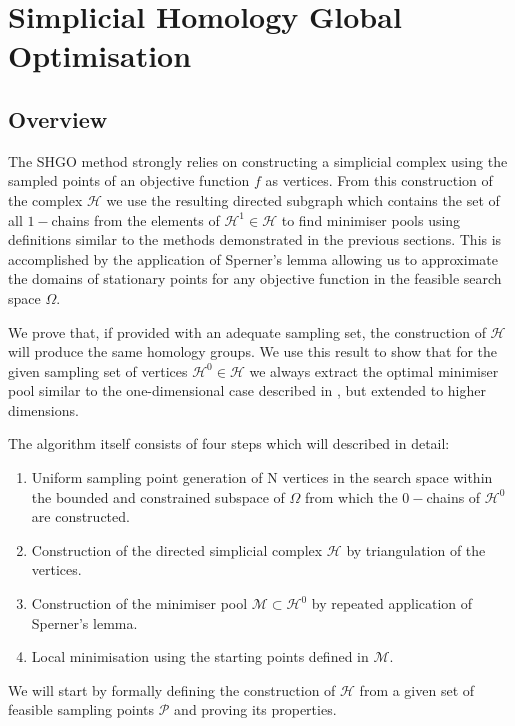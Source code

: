 \chapter{Simplicial Homology Global Optimisation}  \label{sec:shgo}
\section{Overview}
The SHGO method strongly relies on constructing a simplicial complex using the sampled points of an objective function $f$ as vertices. From this construction of the complex $\mathcal{H}$ we use the resulting directed subgraph which contains the set of all $1-$chains from the elements of $\mathcal{H}^1 \in \mathcal{H}$ to find minimiser pools using definitions similar to the methods demonstrated in the previous sections. This is accomplished by the application of Sperner's lemma \cite{Sperner1928} allowing us to approximate the domains of stationary points for any objective function in the feasible search space $\Omega$. 

We prove that, if provided with an adequate sampling set, the construction of $\mathcal{H}$ will produce the same homology groups. We use this result to show that for the given sampling set of vertices $\mathcal{H}^0 \in \mathcal{H}$ we always extract the optimal minimiser pool similar to the one-dimensional case described in , but extended to higher dimensions. 

The algorithm itself consists of four steps which will described in detail:
\begin{enumerate}
\item Uniform sampling point generation of N vertices in the search space within the bounded and constrained subspace of $\Omega$ from which the $0-$chains of $\mathcal{H}^0$ are constructed.
\item Construction of the directed simplicial complex $\mathcal{H}$ by triangulation of the vertices.
\item Construction of the minimiser pool $\mathcal{M} \subset \mathcal{H}^0$ by repeated application of Sperner's lemma.%
\item Local minimisation using the starting points defined in $\mathcal{M}$.
\end{enumerate}

We will start by formally defining the construction of $\mathcal{H}$ from a given set of feasible sampling points $\mathcal{P}$ and proving its properties. %


